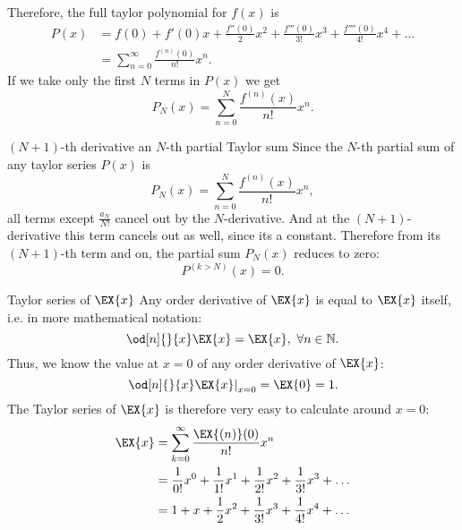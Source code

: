 Therefore, the full taylor polynomial for $f(x)$ is
\begin{equation}
	\begin{aligned}
		P(x) &= f(0) + f'(0)x + \frac{f''(0)}{2}x^{2} + \frac{f'''(0)}{3!}x^{3} + \frac{f''''(0)}{4!}x^{4} + \dots\\
			 &= \sum\limits_{n=0}^{\infty}\frac{f^{(n)}(0)}{n!}x^n.
	\end{aligned}
	\label{eq:taylor_series_around_0_full}
\end{equation}
If we take only the first $N$ terms in $P(x)$ we get
\begin{equation}
	P_{N}(x) = \sum\limits_{n=0}^{N}\frac{f^{(n)}(x)}{n!}x^{n}.
	\label{eq:partial_taylor_sum}
\end{equation}

\begin{note}{$(N+1)$-th derivative an $N$-th partial Taylor sum}{}
	Since the $N$-th partial sum of any taylor series $P(x)$ is 
	\[
		P_{N}(x)=\sum\limits_{n=0}^{N}\frac{f^{(n)}(x)}{n!}x^{n},
	\]
	all terms except $\frac{a_{N}}{N!}$ cancel out by the $N$-derivative. And at the $(N+1)$-derivative this term cancels out as well, since its a constant. Therefore from its $(N+1)$-th term and on, the partial sum $P_{N}(x)$ reduces to zero:
	\[
		P^{(k>N)}(x) = 0.
	\]
\end{note}

\begin{example}{Taylor series of $\EX{x}$}{}
	Any order derivative of $\EX{x}$ is equal to $\EX{x}$ itself, i.e. in more mathematical notation:
	\[
		\od[n]{}{x}\EX{x} = \EX{x},\ \forall n\in\mathbb{N}.
	\]
	Thus, we know the value at $x=0$ of any order derivative of $\EX{x}$:
	\[
		\left.\od[n]{}{x}\EX{x}\right|_{x=0} = \EX{0} = 1.
	\]
	The Taylor series of $\EX{x}$ is therefore very easy to calculate around $x=0$:
	\[
		\begin{aligned}
			\EX{x} &= \sum\limits_{k=0}^{\infty}\frac{\EX{(n)}(0)}{n!}x^{n}\\
				   &= \frac{1}{0!}x^{0} + \frac{1}{1!}x^{1} + \frac{1}{2!}x^{2} + \frac{1}{3!}x^{3} + \dots\\
				   &= 1 + x + \frac{1}{2}x^{2} + \frac{1}{3!}x^{3} + \frac{1}{4!}x^{4} + \dots
		\end{aligned}
	\]
\end{example}

